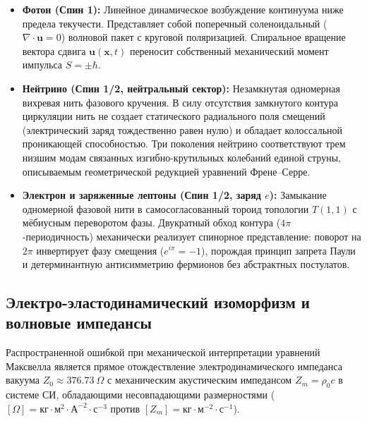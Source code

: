 \documentclass[11pt,a4paper]{article}
\theoremstyle{definition}
\theoremstyle{remark}
\begin{document}

\begin{itemize}
    \item \textbf{Фотон (Спин 1):} Линейное динамическое возбуждение континуума ниже предела текучести. Представляет собой поперечный соленоидальный ($\nabla \cdot \mathbf{u} = 0$) волновой пакет с круговой поляризацией. Спиральное вращение вектора сдвига $\mathbf{u}(\mathbf{x}, t)$ переносит собственный механический момент импульса $S = \pm \hbar$.
    
    \item \textbf{Нейтрино (Спин 1/2, нейтральный сектор):} Незамкнутая одномерная вихревая нить фазового кручения. В силу отсутствия замкнутого контура циркуляции нить не создает статического радиального поля смещений (электрический заряд тождественно равен нулю) и обладает колоссальной проникающей способностью. Три поколения нейтрино соответствуют трем низшим модам связанных изгибно-крутильных колебаний единой струны, описываемым геометрической редукцией уравнений Френе--Серре.
    
    \item \textbf{Электрон и заряженные лептоны (Спин 1/2, заряд $e$):} Замыкание одномерной фазовой нити в самосогласованный тороид топологии $T(1,1)$ с мёбиусным переворотом фазы. Двукратный обход контура ($4\pi$-периодичность) механически реализует спинорное представление: поворот на $2\pi$ инвертирует фазу смещения ($e^{i\pi} = -1$), порождая принцип запрета Паули и детерминантную антисимметрию фермионов без абстрактных постулатов.
\end{itemize}

\subsection{Электро-эластодинамический изоморфизм и волновые импедансы}
Распространенной ошибкой при механической интерпретации уравнений Максвелла 
является прямое отождествление электродинамического импеданса вакуума 
$Z_0 \approx 376.73\ \Omega$ с механическим акустическим импедансом 
$Z_m = \rho_0 c$ в системе СИ, обладающими несовпадающими размерностями 
($[\Omega] = \text{кг}\cdot\text{м}^2\cdot\text{А}^{-2}\cdot\text{с}^{-3}$ против 
$[Z_m] = \text{кг}\cdot\text{м}^{-2}\cdot\text{с}^{-1}$).
\end{document}
